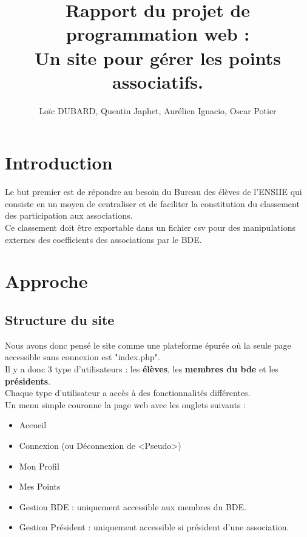 \documentclass[french]{article}
\author{Loïc DUBARD, Quentin Japhet, Aurélien Ignacio, Oscar Potier}
\title{Rapport du projet de programmation web : \\
\textbf{Un site pour gérer les points associatifs}.}
\begin{document}
\maketitle
\tableofcontents
\clearpage
\section*{Introduction}
Le but premier est de répondre au besoin du Bureau des élèves de l'ENSIIE qui consiste en un moyen de centraliser et de faciliter la constitution du classement des participation aux associations.\\

 Ce classement doit être exportable dans un fichier csv pour des manipulations externes des coefficients des associations par le BDE.\\
 
\section{Approche}
\subsection{Structure du site}
Nous avons donc pensé le site comme une plateforme épurée où la seule page accessible sans connexion est "index.php".\\
 Il y a donc 3 type d'utilisateurs : les \textbf{élèves}, les \textbf{membres du bde} et les \textbf{présidents}.\\ Chaque type d'utilisateur a accès à des fonctionnalités différentes.\\ 
 
 Un menu simple couronne la page web avec les onglets suivants : 
 \begin{itemize}
 	\item Accueil
 	\item Connexion (ou Déconnexion de <Pseudo>) 
 	\item Mon Profil
 	\item Mes Points
 	\item Gestion BDE : uniquement accessible aux membres du BDE.
 	\item Gestion Président : uniquement accessible si président d'une association.
 \end{itemize}
 
\end{document}
